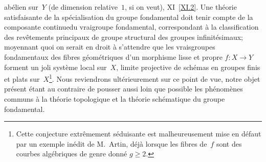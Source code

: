 \begin{remarques}
ab\'elien sur~$Y$ (de dimension relative~$1$, si on veut),
\cf XI~\ref{XI.2}.
Une th\'eorie satisfaisante de la
sp\'ecialisation du groupe fondamental doit tenir compte de la
\og composante continue\fg du \og vrai\fg groupe fondamental, correspondant
\`a la classification des rev\^etements principaux de groupe
structural des groupes infinit\'esimaux; moyennant quoi on serait en
droit \`a s'attendre que les \og vrais\fg groupes fondamentaux des
fibres g\'eom\'etriques d'un morphisme lisse et propre $f\colon
X\to Y$ forment un joli syst\`eme local sur~$X$, limite projective
de sch\'emas en groupes finis et plats sur~$X$\footnote{Cette
conjecture extr\^emement s\'eduisante est malheureusement mise en
d\'efaut par un exemple in\'edit de M.\, Artin, d\'ej\`a lorsque
les fibres de~$f$ sont des courbes alg\'ebriques de genre donn\'e
$g\ge 2$.}. Nous reviendrons ult\'erieurement sur ce point de vue,
notre objet pr\'esent \'etant au contraire de pousser aussi loin
que possible les ph\'enom\`enes communs \`a la th\'eorie
topologique et la th\'eorie sch\'ematique du groupe fondamental.
\end{remarques}

